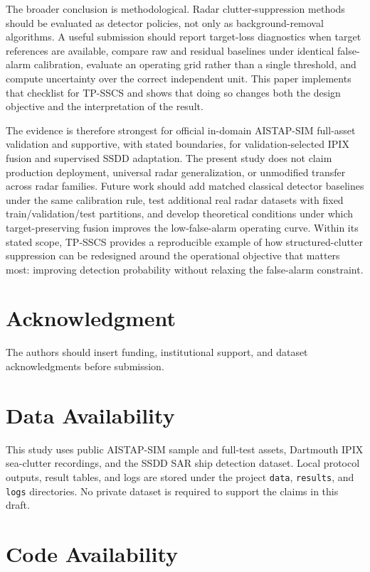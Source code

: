 \documentclass[journal]{IEEEtran}
\begin{document}
The broader conclusion is methodological. Radar clutter-suppression methods should be evaluated as detector policies, not only as background-removal algorithms. A useful submission should report target-loss diagnostics when target references are available, compare raw and residual baselines under identical false-alarm calibration, evaluate an operating grid rather than a single threshold, and compute uncertainty over the correct independent unit. This paper implements that checklist for TP-SSCS and shows that doing so changes both the design objective and the interpretation of the result.

The evidence is therefore strongest for official in-domain AISTAP-SIM full-asset validation and supportive, with stated boundaries, for validation-selected IPIX fusion and supervised SSDD adaptation. The present study does not claim production deployment, universal radar generalization, or unmodified transfer across radar families. Future work should add matched classical detector baselines under the same calibration rule, test additional real radar datasets with fixed train/validation/test partitions, and develop theoretical conditions under which target-preserving fusion improves the low-false-alarm operating curve. Within its stated scope, TP-SSCS provides a reproducible example of how structured-clutter suppression can be redesigned around the operational objective that matters most: improving detection probability without relaxing the false-alarm constraint.

\section*{Acknowledgment}

The authors should insert funding, institutional support, and dataset acknowledgments before submission.

\section*{Data Availability}

This study uses public AISTAP-SIM sample and full-test assets, Dartmouth IPIX sea-clutter recordings, and the SSDD SAR ship detection dataset. Local protocol outputs, result tables, and logs are stored under the project \texttt{data}, \texttt{results}, and \texttt{logs} directories. No private dataset is required to support the claims in this draft.

\section*{Code Availability}
\end{document}
